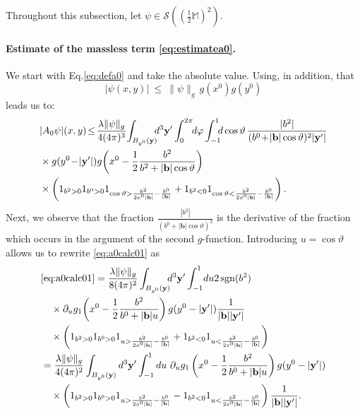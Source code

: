 \documentclass[b5paper,draft,openbib,12pt]{memoir}
\newcommand{\M}{\mathbb{M}}
\newcommand{\vy}{\mathbf{y}}
\newcommand{\vb}{\mathbf{b}}
\DeclareMathOperator{\sgn}{sgn}
\begin{document}
Throughout this subsection, let $\psi \in 
\mathcal{S}((\tfrac{1}{2}\M)^2)$.

\paragraph{Estimate of the massless term 
\eqref{eq:estimatea0}.} \label{sec:estimatemassless}

We start with Eq.\@ \eqref{eq:defa0} and take the 
absolute value. Using, in addition, that
\begin{equation}
	|\psi(x,y)| ~\leq~ \| \psi \|_g \, g(x^0) g(y^0)
\end{equation}
leads us to:
\begin{align}
    &|A_0\psi|(x,y) \!\le\! \frac{\lambda \|\psi\|_g}{4(4\pi)^3} \!\int_{B_{y^0}(\vy)}\!\!\!d^3 \vy' \int_0^{2\pi} \!\!d\varphi \int_{-1}^1 \!\!\!d\cos\vartheta \, \frac{|b^2|}{(b^0\!+\!|\vb|\cos\vartheta)^2 |\vy'|} \nonumber\\
    &\times g(y^0\!-\!|\vy'|) g\!\left(x^0-\frac{1}{2}\frac{b^2}{b^2+|\vb|\cos\vartheta}\right)\notag\\
    &\times \left(1_{b^2>0}1_{b^0>0} 1_{\cos\vartheta > \frac{b^2}{2x^0|\vb|} - \frac{b^0}{|\vb|}}+1_{b^2<0}1_{\cos\vartheta<\frac{b^2}{2x^0|\vb|} - \frac{b^0}{|\vb|}}\right).
\label{eq:a0calc01}
\end{align}
Next, we observe that the fraction 
$\frac{|b^2|}{(b^0+|\vb|\cos\vartheta)^2}$ is 
the derivative of the fraction which occurs in the 
argument of the second $g$-function. Introducing 
$u = \cos \vartheta$ allows us to rewrite 
\eqref{eq:a0calc01} as
\begin{align}
     &\eqref{eq:a0calc01} =\frac{\lambda \|\psi\|_g}{8(4\pi)^2} \int_{B_{y^0}(\vy)}\!\!\!d^3\vy' \int_{-1}^1\!du  2 \sgn(b^2)\,  \notag\\
    &\quad \times \partial_u g_1\!\left(x^0-\frac{1}{2}\frac{b^2}{b^0+|\vb|u}\right) g(y^0-|\vy'|) \frac{1}{|\vb||\vy'|}\\\nonumber
    &\quad \times \left(1_{b^2>0}1_{b^0>0} 1_{u > \frac{b^2}{2x^0|\vb|} - \frac{b^0}{|\vb|}}+1_{b^2<0}1_{u<\frac{b^2}{2x^0|\vb|} - \frac{b^0}{|\vb|}}\right) \\
    &=\frac{\lambda \|\psi\|_g}{4(4\pi)^2} \int_{B_{y^0}(\vy)}d^3\vy' \int_{-1}^1 du  ~ \partial_u g_1\left(x^0-\frac{1}{2}\frac{b^2}{b^0+|\vb|u}\right) g(y^0-|\vy'|)\nonumber\\
    &\quad \times   \left(1_{b^2>0}1_{b^0>0} 1_{u > \frac{b^2}{2x^0|\vb|} - \frac{b^0}{|\vb|}}-1_{b^2<0}1_{u<\frac{b^2}{2x^0|\vb|} - \frac{b^0}{|\vb|}}\right) \frac{1}{|\vb||\vy'|}.
\label{eq:a0calc02}
\end{align}
\end{document}
